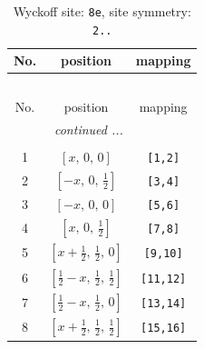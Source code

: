 \documentclass[fleqn,8pt]{jsarticle}
\begin{document}
\renewcommand{\arraystretch}{1.2}
\begin{longtable}{ccc}
\caption{Wyckoff site: {\tt 8e}, site symmetry: {\tt 2..}}
 \\
 \hline \hline
No. & position & mapping \\ \hline \endfirsthead

\multicolumn{2}{l}{\tablename\ \thetable{}} \\
 \hline \hline
No. & position & mapping \\ \hline \endhead

 \hline \hline
\multicolumn{2}{r}{\footnotesize\it continued ...} \\ \endfoot

 \hline \hline
\multicolumn{2}{r}{} \\ \endlastfoot

1 & $\left[ x,\, 0,\, 0 \right]$ & {\tt [1,2]} \\ \hline
2 & $\left[ - x,\, 0,\, \frac{1}{2} \right]$ & {\tt [3,4]} \\ \hline
3 & $\left[ - x,\, 0,\, 0 \right]$ & {\tt [5,6]} \\ \hline
4 & $\left[ x,\, 0,\, \frac{1}{2} \right]$ & {\tt [7,8]} \\ \hline
5 & $\left[ x + \frac{1}{2},\, \frac{1}{2},\, 0 \right]$ & {\tt [9,10]} \\ \hline
6 & $\left[ \frac{1}{2} - x,\, \frac{1}{2},\, \frac{1}{2} \right]$ & {\tt [11,12]} \\ \hline
7 & $\left[ \frac{1}{2} - x,\, \frac{1}{2},\, 0 \right]$ & {\tt [13,14]} \\ \hline
8 & $\left[ x + \frac{1}{2},\, \frac{1}{2},\, \frac{1}{2} \right]$ & {\tt [15,16]} \\
\end{longtable}
\renewcommand{\arraystretch}{1.2}
\end{document}
